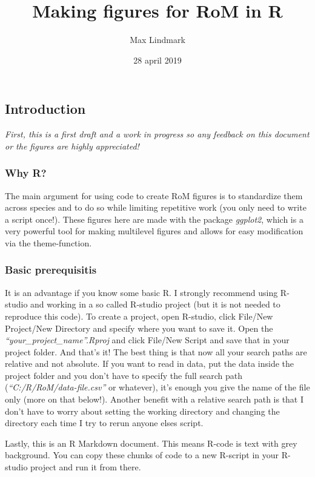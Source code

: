 \documentclass[]{article}
\title{Making figures for RoM in R}
\author{Max Lindmark}
\date{28 april 2019}
\begin{document}
\maketitle

\subsection{Introduction}\label{introduction}

\emph{First, this is a first draft and a work in progress so any
feedback on this document or the figures are highly appreciated!}

\subsubsection{Why R?}\label{why-r}

The main argument for using code to create RoM figures is to standardize
them across species and to do so while limiting repetitive work (you
only need to write a script once!). These figures here are made with the
package \emph{ggplot2}, which is a very powerful tool for making
multilevel figures and allows for easy modification via the
theme-function.

\subsubsection{Basic prerequisitis}\label{basic-prerequisitis}

It is an advantage if you know some basic R. I strongly recommend using
R-studio and working in a so called R-studio project (but it is not
needed to reproduce this code). To create a project, open R-studio,
click File/New Project/New Directory and specify where you want to save
it. Open the \emph{``your\_project\_name''.Rproj} and click File/New
Script and save that in your project folder. And that's it! The best
thing is that now all your search paths are relative and not absolute.
If you want to read in data, put the data inside the project folder and
you don't have to specify the full search path
(\emph{``C:/R/RoM/data-file.csv''} or whatever), it's enough you give
the name of the file only (more on that below!). Another benefit with a
relative search path is that I don't have to worry about setting the
working directory and changing the directory each time I try to rerun
anyone elses script.

Lastly, this is an R Markdown document. This means R-code is text with
grey background. You can copy these chunks of code to a new R-script in
your R-studio project and run it from there.
\end{document}
